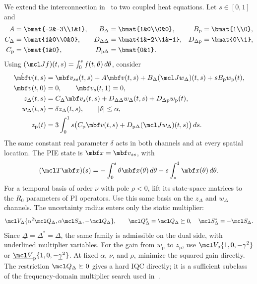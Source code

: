 \begin{example}
We extend the interconnection in~\cite[Sec.~8.1]{veenman2016robust}
to two coupled heat equations.
Let $s\in[0,1]$ and
\begin{align*}
 A&=\bmat{-2&-3\\1&1},
 &B_\Delta&=\bmat{1&0\\0&0},&B_{\mathrm p}&=\bmat{1\\0},\\
 C_\Delta&=\bmat{1&0\\0&0},
 &D_{\Delta\Delta}&=\bmat{1&-2\\1&-1},
 &D_{\Delta\mathrm p}&=\bmat{0\\1},\\
 C_{\mathrm p}&=\bmat{1&0},
 &D_{\mathrm p\Delta}&=\bmat{0&1}.
\end{align*}
Using $(\mcl Jf)(t,s)=\int_0^s f(t,\theta)\,d\theta$, consider
\begin{align*}
 \dot{\mbf v}(t,s)&=\mbf v_{ss}(t,s)+A\mbf v(t,s)
       +B_\Delta(\mcl Jw_\Delta)(t,s)+sB_{\mathrm p}w_{\mathrm p}(t),\\
 \mbf v(t,0)&=0,\qquad \mbf v_s(t,1)=0,\\
 z_\Delta(t,s)&=C_\Delta\mbf v_s(t,s)
       +D_{\Delta\Delta}w_\Delta(t,s)+D_{\Delta\mathrm p}w_{\mathrm p}(t),\\
 w_\Delta(t,s)&=\delta z_\Delta(t,s),\qquad |\delta|\leq\alpha,\\
 z_{\mathrm p}(t)&=3\int_0^1s\bigl(C_{\mathrm p}\mbf v(t,s)
       +D_{\mathrm p\Delta}(\mcl Jw_\Delta)(t,s)\bigr)\,ds.
\end{align*}
The same constant real parameter $\delta$ acts in both channels and at
every spatial location. The PIE state is $\mbf x=\mbf v_{ss}$, with
\[
 (\mcl T\mbf x)(s)=-\int_0^s\theta\mbf x(\theta)\,d\theta
                       -s\int_s^1\mbf x(\theta)\,d\theta.
\]
For a temporal basis of order $\nu$ with pole $\rho<0$, lift its
state-space matrices to the $R_0$ parameters of PI operators. Use this
same basis on the $z_\Delta$ and $w_\Delta$ channels. The uncertainty
radius enters only the static multiplier:
\[
 \mcl V_\Delta\{\alpha^2\mcl Q_\Delta,
                    \alpha\mcl S_\Delta,-\mcl Q_\Delta\},\qquad
 \mcl Q_\Delta^*=\mcl Q_\Delta\succeq0,\quad
 \mcl S_\Delta^*=-\mcl S_\Delta.
\]
Since $\underline\Delta=\Delta^*=\Delta$, the same family is admissible
on the dual side, with underlined multiplier variables. For the gain from
$w_{\mathrm p}$ to $z_{\mathrm p}$, use
$\mcl V_{\mathrm p}\{1,0,-\gamma^2\}$ or
$\underline{\mcl V}_{\mathrm p}\{1,0,-\underline\gamma^2\}$.
At fixed $\alpha$, $\nu$, and $\rho$, minimize the squared gain directly.
The restriction $\mcl Q_\Delta\succeq0$ gives a hard IQC directly;
it is a sufficient subclass of the frequency-domain multiplier search
used in~\cite[Fig.~7]{veenman2016robust}.
\end{example}
